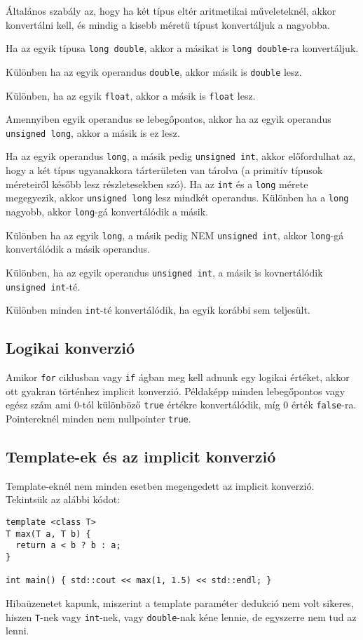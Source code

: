 \documentclass[../cpp_book/cpp_book.tex]{subfiles}
\begin{document}
	Általános szabály az, hogy ha két típus eltér aritmetikai műveleteknél, akkor konvertálni kell, és mindig a kisebb méretű típust konvertáljuk a nagyobba.
	\begin{compactenum}
		\item Ha az egyik típusa \texttt{long double}, akkor a másikat is \texttt{long double}-ra konvertáljuk.
		\item Különben ha az egyik operandus \texttt{double}, akkor másik is \texttt{double} lesz.
		\item Különben, ha az egyik \texttt{float}, akkor a másik is \texttt{float} lesz.
		\item Amennyiben egyik operandus se lebegőpontos, akkor ha az egyik operandus \texttt{unsigned long}, akkor a másik is ez lesz.
		\item Ha az egyik operandus \texttt{long}, a másik pedig \texttt{unsigned int}, akkor előfordulhat az, hogy a két típus ugyanakkora tárterületen van tárolva (a primitív típusok méreteiről később lesz részletesekben szó). Ha az \texttt{int} és a \texttt{long} mérete megegyezik, akkor \texttt{unsigned
			long} lesz mindkét operandus. Különben ha a \texttt{long} nagyobb, akkor \texttt{long}-gá konvertálódik a másik.
		\item Különben ha az egyik \texttt{long}, a másik pedig NEM \texttt{unsigned int}, akkor \texttt{long}-gá konvertálódik a másik operandus.
		\item Különben, ha az egyik operandus \texttt{unsigned int}, a másik is kovnertálódik \texttt{unsigned int}-té.
		\item Különben minden \texttt{int}-té konvertálódik, ha egyik korábbi sem teljesült.
	\end{compactenum}
	\subsection{Logikai konverzió}
	Amikor \texttt{for} ciklusban vagy \texttt{if} ágban meg kell adnunk egy logikai értéket, akkor ott gyakran történhez implicit konverzió. Példaképp minden lebegőpontos vagy egész szám ami 0-tól különböző \texttt{true} értékre konvertálódik, míg 0 érték \texttt{false}-ra. Pointereknél minden nem nullpointer \texttt{true}.
	\subsection{Template-ek és az implicit konverzió}
	Template-eknél nem minden esetben megengedett az implicit konverzió. Tekintsük az alábbi kódot:
	\begin{lstlisting}
template <class T>
T max(T a, T b) {
  return a < b ? b : a;
}

int main() { std::cout << max(1, 1.5) << std::endl; }
	\end{lstlisting}
	Hibaüzenetet kapunk, miszerint a template paraméter dedukció nem volt sikeres, hiszen \texttt{T}-nek vagy \texttt{int}-nek, vagy \texttt{double}-nak kéne lennie, de egyszerre nem tud az lenni.
\end{document}
